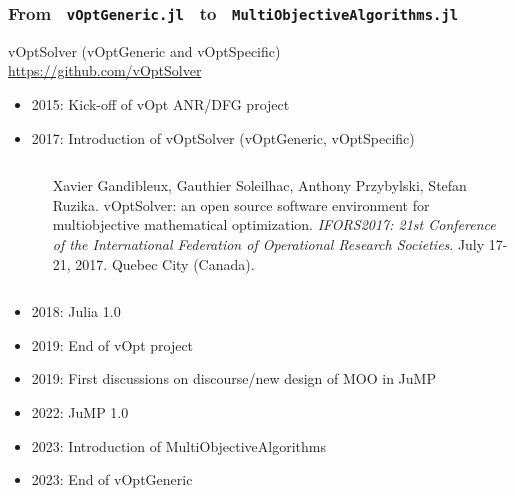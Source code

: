 \documentclass[]{beamer}
\begin{document}
\begin{frame}
  \frametitle{From \ {\large \texttt{vOptGeneric.jl}} \ to \ {\large \texttt{MultiObjectiveAlgorithms.jl}}}
\vspace{3mm}

vOptSolver (vOptGeneric and vOptSpecific)\vspace{-2mm}\\
    \smallskip
    {\small
    \url{https://github.com/vOptSolver}    
    }
    \smallskip

 {\scriptsize
\begin{itemize}
    \item[] 2015: Kick-off of vOpt ANR/DFG project\vspace{-1.25mm}\\
    \item[] 2017: Introduction of vOptSolver (vOptGeneric, vOptSpecific)\vspace{1.25mm}\\
    \begin{columns}
      \begin{column}{0.05\textwidth}
      \end{column}
      \begin{column}{0.85\textwidth}
              {\tiny
Xavier Gandibleux, Gauthier Soleilhac, Anthony Przybylski, Stefan Ruzika. vOptSolver: an open source software environment for multiobjective mathematical optimization. \textit{IFORS2017: 21st Conference of the International Federation of Operational Research Societies}. July 17-21, 2017. Quebec City (Canada).\vspace{0.5mm}\\}
      \end{column}
      \end{columns}

    
    \item[] 2018: Julia 1.0\vspace{-1.25mm}\\
    \item[] 2019: End of vOpt project   \vspace{-1.25mm}\\
    \item[] 2019: First discussions on discourse/new design of MOO in JuMP\vspace{-1.25mm}\\
    \item[] 2022: JuMP 1.0\vspace{-1.25mm}\\
    \item[] 2023: Introduction of MultiObjectiveAlgorithms\vspace{-1.25mm}\\
    \item[] 2023: End of vOptGeneric
\end{itemize}
}
    \smallskip
    \pause
    

\end{frame}
\end{document}
